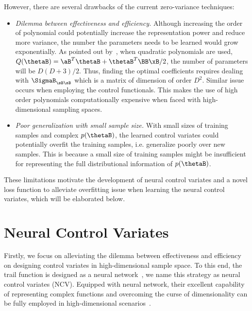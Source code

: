 \documentclass[runningheads]{llncs}
\begin{document}
However, there are several drawbacks of the current zero-variance techniques:
\begin{itemize}
 \item \emph{Dilemma between effectiveness and efficiency.} Although increasing the order of polynomial could potentially increase the representation power and reduce more variance, the number the parameters needs to be learned would grow exponentially. As pointed out by~\cite{mira2013zero}, when quadratic polynomials are used, $Q(\thetaB) = \aB^T \thetaB +\thetaB^T \BB \xB /2$, the number of parameters will be $D(D+3)/2$. Thus, finding the optimal coefficients requires dealing with $\SigmaB_{\sB \sB}$ which is a matrix
of dimension of order $D^2$. Similar issue occurs when employing the control functionals. This makes the use of high order polynomials computationally expensive when faced with high-dimensional sampling spaces. 
\item \emph{Poor generalization with small sample size.} With small sizes of training samples and complex $p(\thetaB)$,  the learned control variates could potentially overfit the training samples, i.e. generalize poorly over new samples.  This is because a small size of training samples might be insufficient for representing the full distributional information of $p(\thetaB)$.  
\end{itemize}


These limitations motivate the development of neural control variates and a novel loss function to alleviate overfitting issue when learning the neural control variates, which will be elaborated below.

\section{Neural Control Variates}
Firstly, we focus on alleviating  the dilemma between effectiveness and efficiency on designing control variates in  high-dimensional sample space. 
To this end, the trail function is designed as a neural network~\cite{liu2017action,tucker2017rebar}, we name this strategy as neural control variates (NCV). 
Equipped with neural network, their excellent capability of representing complex functions and overcoming the curse of dimensionality can be fully employed in high-dimensional scenarios~\cite{lecun2015deep}. 
\end{document}
